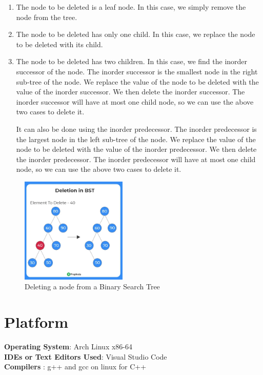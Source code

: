 \documentclass[11pt]{article}
\begin{document}
\begin{enumerate}
	\item The node to be deleted is a leaf node. In this case, we simply remove the node from the tree.
	\item The node to be deleted has only one child. In this case, we replace the node to be deleted with its child.
	\item The node to be deleted has two children. In this case, we find the inorder successor of the node. The inorder successor is the smallest node in the right sub-tree of the node. We replace the value of the node to be deleted with the value of the inorder successor. We then delete the inorder successor. The inorder successor will have at most one child node, so we can use the above two cases to delete it.

	      It can also be done using the inorder predecessor. The inorder predecessor is the largest node in the left sub-tree of the node. We replace the value of the node to be deleted with the value of the inorder predecessor. We then delete the inorder predecessor. The inorder predecessor will have at most one child node, so we can use the above two cases to delete it.
\end{enumerate}

\begin{figure}[H]
	\centering
	\includegraphics[width=0.45\textwidth]{figures/Deletion_BST.png}
	\caption{Deleting a node from a Binary Search Tree}
	\label{fig:Deleting a node from a Binary Search Tree}
\end{figure}

\section{Platform}
\textbf{Operating System}: Arch Linux x86-64 \\
\textbf{IDEs or Text Editors Used}: Visual Studio Code\\
\textbf{Compilers} : g++ and gcc on linux for C++\\
\end{document}

